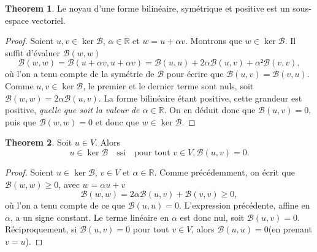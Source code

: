\documentclass[12pt, final]{scrartcl}
\theoremstyle{definition}
\newtheorem{theorem}{Theorem}
\newcommand{\reals}{\mathbb{R}}
\begin{document}
\begin{theorem}
  Le noyau d'une forme bilinéaire, symétrique et positive est un sous-espace
  vectoriel.
\end{theorem}
\begin{proof}
  Soient \(u, v∈\ker \mathcal{B}\), \(α∈\reals\) et \(w = u + α v\). Montrons
  que \(w ∈ \ker\mathcal{B}\). Il suffit d'évaluer \(\mathcal{B}(w, w)\)
 \begin{equation}
   \mathcal{B}(w, w) = \mathcal{B}(u + α v, u + α v)
   = \mathcal{B}(u, u) + 2 α \mathcal{B}(u, v) + α² \mathcal{B}(v, v),
 \end{equation}
 où l'on a tenu compte de la symétrie de \(\mathcal{B}\) pour écrire que
 \(\mathcal{B}(u, v) =\mathcal{B}(v, u)\). Comme \(u, v ∈ \ker\mathcal{B}\), le
 premier et le dernier terme sont nuls, soit
 \(\mathcal{B}(w, w) = 2α \mathcal{B}(u, v)\). La forme bilinéaire étant
 positive, cette grandeur est positive, \emph{quelle que soit la valeur de
   \(α∈\reals\)}. On en déduit donc que \(\mathcal{B}(u, v) = 0\), puis que
 \(\mathcal{B}(w, w) = 0\) et donc que \(w ∈ \ker\mathcal{B}\).
\end{proof}

\begin{theorem}
 Soit \(u∈V\). Alors
 \begin{equation}
  u ∈ \ker\mathcal{B} \quad \text{ssi} \quad \text{pour tout } v ∈ V, \mathcal{B}(u, v) = 0.
 \end{equation}
\end{theorem}

\begin{proof}
  Soient \(u∈\ker \mathcal{B}\), \(v∈V\) et \(α∈\reals\). Comme précédemment, on
  écrit que \(\mathcal{B}(w, w) ≥ 0\), avec \(w = α u + v\)
 \begin{equation}
  \mathcal{B}(w, w) = 2 α \mathcal{B}(u, v) +\mathcal{B}(v, v) \geq
  0,
 \end{equation}
 où l'on a tenu compte de ce que \(\mathcal{B}(u, u) = 0\). L'expression
 précédente, affine en \(α\), a un signe constant. Le terme linéaire en \(α\)
 est donc nul, soit \(\mathcal{B}(u, v) = 0\).  Réciproquement, si
 \(\mathcal{B}(u, v) = 0\) pour tout \(v∈V\), alors \(\mathcal{B}(u, u) = 0\)(en
 prenant \(v = u\)).
\end{proof}
\end{document}
